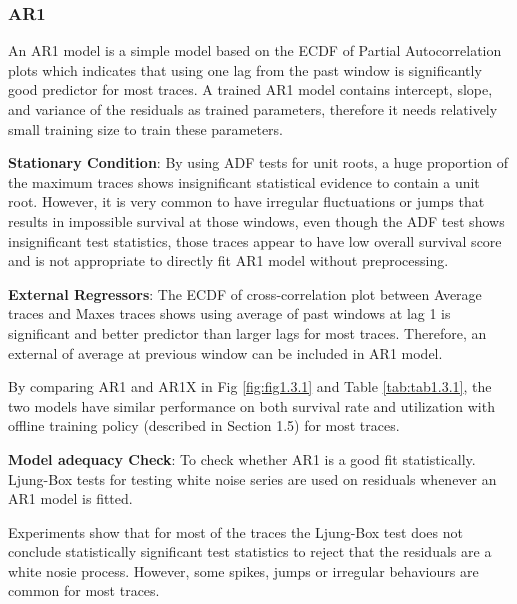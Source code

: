 \documentclass{article}
\begin{document}
\subsubsection{AR1}

\begin{flushleft}
An AR1 model is a simple model based on the ECDF of Partial Autocorrelation plots which indicates that using one lag from the past window is significantly good predictor for most traces. A trained AR1 model contains intercept, slope, and variance of the residuals as trained parameters, therefore it needs relatively small training size to train these parameters. 
\end{flushleft}

\begin{flushleft}
\textbf{Stationary Condition}: By using ADF tests for unit roots, a huge proportion of the maximum traces shows insignificant statistical evidence to contain a unit root. However, it is very common to have irregular fluctuations or jumps that results in impossible survival at those windows, even though the ADF test shows insignificant test statistics, those traces appear to have low overall survival score and is not appropriate to directly fit AR1 model without preprocessing.
\end{flushleft}

\begin{flushleft}
\textbf{External Regressors}: The ECDF of cross-correlation plot between Average traces and Maxes traces shows using average of past windows at lag 1 is significant and better predictor than larger lags for most traces. Therefore, an external of average at previous window can be included in AR1 model.

By comparing AR1 and AR1X in Fig \ref{fig:fig1.3.1} and Table \ref{tab:tab1.3.1}, the two models have similar performance on both survival rate and utilization with offline training policy (described in Section 1.5) for most traces.
\end{flushleft}

\begin{flushleft}
\textbf{Model adequacy Check}: To check whether AR1 is a good fit statistically. Ljung-Box tests for testing white noise series are used on residuals whenever an AR1 model is fitted.

Experiments show that for most of the traces the Ljung-Box test does not conclude statistically significant test statistics to reject that the residuals are a white nosie process. However, some spikes, jumps or irregular behaviours are common for most traces. 
\end{flushleft}
\end{document}
